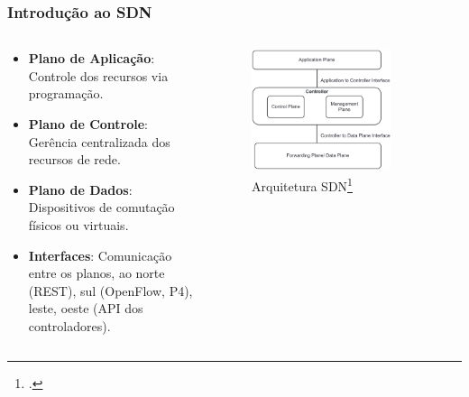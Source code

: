 \begin{frame}
    \frametitle{Introdução ao SDN}
    \begin{columns}
        \begin{column}{0.55\textwidth}
            \begin{itemize}
                \item \textbf{Plano de Aplicação}: Controle dos recursos via programação.
                \item \textbf{Plano de Controle}: Gerência centralizada dos recursos de rede.
                \item \textbf{Plano de Dados}: Dispositivos de comutação físicos ou virtuais.
                \item \textbf{Interfaces}: Comunicação entre os planos, ao norte (REST), sul (OpenFlow, P4), leste, oeste (API dos controladores).
        \end{itemize}            
        \end{column}
        \begin{column}{0.45\textwidth}
            \vspace{2cm}
            \begin{figure}[h]
                \centering
                \includegraphics[width=0.8\textwidth]{figs/SDN_arquitetura.png}
                \caption{Arquitetura SDN\footcite{Recommended_SDN_Wireless}}
            \end{figure}
        \end{column}
    \end{columns}
\end{frame}

